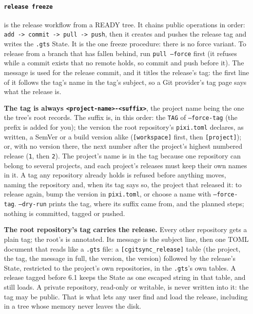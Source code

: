 \paragraph{\texttt{release freeze}} is the release workflow from a READY
tree. It chains public operations in order: \texttt{add -> commit -> pull ->
push}, then it creates and pushes the release tag and writes the
\texttt{.gts} State. It is the one freeze procedure: there is no force
variant. To release from a branch that has fallen behind, run \texttt{pull
--force} first (it refuses while a commit exists that no remote holds, so
commit and push before it). The message is used for the release commit, and
it titles the release's tag: the first line of it follows the tag's name in
the tag's subject, so a Git provider's tag page says what the release is.

\textbf{The tag is always \texttt{<project-name>-<suffix>}}, the project
name being the one the tree's root records. The suffix is, in this order:
the \texttt{TAG} of \texttt{--force-tag} (the prefix is added for you); the
version the root repository's \texttt{pixi.toml} declares, as written, a
SemVer or a build version alike (\texttt{[workspace]} first, then
\texttt{[project]}); or, with no version there, the next number after the
project's highest numbered release (\texttt{1}, then \texttt{2}). The
project's name is in the tag because one repository can belong to several
projects, and each project's releases must keep their own names in it. A
tag any repository already holds is refused before anything moves, naming
the repository and, when its tag says so, the project that released it: to
release again, bump the version in \texttt{pixi.toml}, or choose a name with
\texttt{--force-tag}. \texttt{--dry-run} prints the tag, where its suffix
came from, and the planned steps; nothing is committed, tagged or pushed.

\textbf{The root repository's tag carries the release.} Every other
repository gets a plain tag; the root's is annotated. Its message is the
subject line, then one TOML document that reads like a \texttt{.gts} file:
a \texttt{[cgitsync\_release]} table (the project, the tag, the message in
full, the version, the \cgscli{} version) followed by the release's State,
restricted to the project's own repositories, in the \texttt{.gts}'s own
tables. A release tagged before 6.1 keeps the State as one escaped string in
that table, and still loads. A private repository, read-only or writable, is
never written into it: the tag may be public. That is what lets any user
find and load the release, including in a tree whose memory never leaves the
disk.

